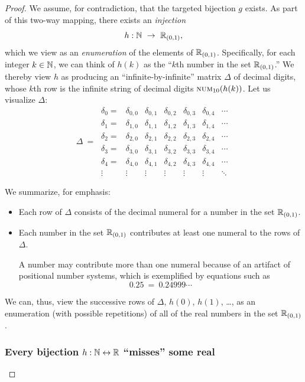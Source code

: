 \begin{proof}
We assume, for contradiction, that the targeted bijection $g$ exists.
As part of this two-way mapping, there exists an {\em injection}
\[ 
h: \N \ \rightarrow \ \R_{(0,1)},
\]
which we view as an {\em enumeration} of the elements of $\mathbb{R}_{(0,1)}$.
Specifically, for each integer $k \in \mathbb{N}$, we can think of $h(k)$ as
the ``$k$th number in the set $\mathbb{R}_{(0,1)}$.''  We thereby view $h$ as
producing an ``infinite-by-infinite'' matrix $\Delta$ of decimal
digits, whose $k$th row is the infinite string of decimal digits
$\mbox{\sc num}_{10}(h(k))$.  Let us visualize $\Delta$:
\[ \Delta \ = \
\begin{array}{ccccccc}
\delta_0 = &
\delta_{0,0} & \delta_{0,1} & \delta_{0,2} & \delta_{0,3} &
	\delta_{0,4} & \cdots \\
\delta_1 = &
\delta_{1,0} & \delta_{1,1} & \delta_{1,2} & \delta_{1,3} &
	\delta_{1,4} & \cdots \\
\delta_2 = &
\delta_{2,0} & \delta_{2,1} & \delta_{2,2} & \delta_{2,3} &
	\delta_{2,4} & \cdots \\
\delta_3 = &
\delta_{3,0} & \delta_{3,1} & \delta_{3,2} & \delta_{3,3} &
	\delta_{3,4} & \cdots \\ 
\delta_4 = &
\delta_{4,0} & \delta_{4,1} & \delta_{4,2} & \delta_{4,3} &
	\delta_{4,4} & \cdots \\ 
\vdots &
\vdots  & \vdots  & \vdots  & \vdots  & \vdots  & \ddots
\end{array}
\]

\noindent We summarize, for emphasis:
\begin{itemize}
\item
Each row of $\Delta$ consists of the decimal numeral for a number in
the set $\mathbb{R}_{(0,1)}$.

\item
Each number in the set $\mathbb{R}_{(0,1)}$ contributes at least one numeral
to the rows of $\Delta$.

A number may contribute more than one numeral because of an artifact
of positional number systems, which is exemplified by equations such
as
\[ 0.25 \ = \ 0.24999\cdots \]
\end{itemize}
We can, thus, view the successive rows of $\Delta$, $h(0)$, $h(1)$,
\ldots, as an enumeration (with possible repetitions) of all of the
real numbers in the set $\mathbb{R}_{(0,1)}$.

\subsubsection{Every bijection $h: \mathbb{N} \leftrightarrow \mathbb{R}$ ``misses'' some real}


\end{proof}
